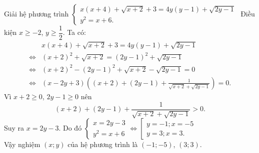 \begin{ex}%
Giải hệ phương trình $\left\{ \begin{array}{l}
x\left( {x + 4} \right) + \sqrt {x + 2}  + 3 = 4y\left( {y - 1} \right) + \sqrt {2y - 1} \\
y^2 = x + 6.
\end{array} \right.$
\loigiai
{
Điều kiện 
$x\ge -2$, $y\ge \dfrac{1}{2}$.
Ta có: 
{\allowdisplaybreaks
\begin{align*}
&x\left( x+4 \right)+\sqrt{x+2}+3=4y\left( y-1 \right)+\sqrt{2y-1}\\
\Leftrightarrow& (x+2)^{2}+\sqrt{x+2}={(2y-1)}^{2}+\sqrt{2y-1}\\
\Leftrightarrow& (x+2)^{2}-(2y-1)^{2}+\sqrt{x+2}-\sqrt{2y-1}=0\\
\Leftrightarrow& (x-2y+3)\left( (x+2)+(2y-1)+\frac{1}{\sqrt{x+2}+\sqrt{2y-1}} \right)=0.
\end{align*}}Vì $x+2\ge 0$, $2y-1\ge 0$ nên \[(x+2)+(2y-1)+\frac{1}{\sqrt{x+2}+\sqrt{2y-1}}>0.\]
Suy ra $x=2y-3$.
Do đó 
$\left\{ \begin{array}{l}
x = 2y - 3\\
y^2 = x + 6 
\end{array} \right. \Leftrightarrow \left[ \begin{array}{l}
y =  - 1;x =  - 5\\
y = 3;x = 3.
\end{array} \right.$\\
Vậy nghiệm $(x; y)$ của hệ phương trình là $(-1; -5)$, $(3; 3)$.
 }
\end{ex}

